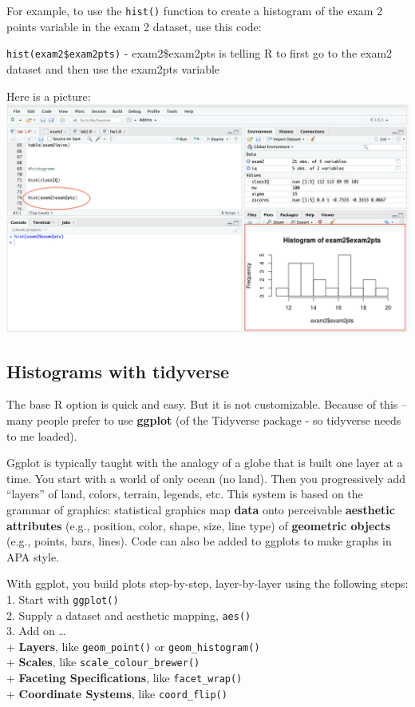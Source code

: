 \documentclass[
]{book}
\begin{document}
For example, to use the \texttt{hist()} function to create a histogram of the exam 2 points variable in the exam 2 dataset, use this code:

\texttt{hist(exam2\$exam2pts)}
- exam2\$exam2pts is telling R to first go to the exam2 dataset and then use the exam2pts variable

Here is a picture:\\
\includegraphics{img/basehist2.png}

\hypertarget{histograms-with-tidyverse}{%
\subsection{Histograms with tidyverse}\label{histograms-with-tidyverse}}

The base R option is quick and easy. But it is not customizable. Because of this -- many people prefer to use \textbf{ggplot} (of the Tidyverse package - so tidyverse needs to me loaded).

Ggplot is typically taught with the analogy of a globe that is built one layer at a time. You start with a world of only ocean (no land). Then you progressively add ``layers'' of land, colors, terrain, legends, etc. This system is based on the grammar of graphics: statistical graphics map \textbf{data} onto perceivable \textbf{aesthetic attributes} (e.g., position, color, shape, size, line type) of \textbf{geometric objects} (e.g., points, bars, lines). Code can also be added to ggplots to make graphs in APA style.

With ggplot, you build plots step-by-step, layer-by-layer using the following steps:\\
1. Start with \texttt{ggplot()}\\
2. Supply a dataset and aesthetic mapping, \texttt{aes()}\\
3. Add on \ldots{}\\
+ \textbf{Layers}, like \texttt{geom\_point()} or \texttt{geom\_histogram()}\\
+ \textbf{Scales}, like \texttt{scale\_colour\_brewer()}\\
+ \textbf{Faceting Specifications}, like \texttt{facet\_wrap()}\\
+ \textbf{Coordinate Systems}, like \texttt{coord\_flip()}
\end{document}

